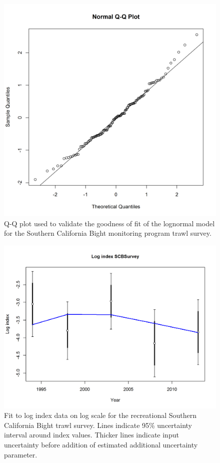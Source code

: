 \documentclass[12pt,]{article}
\begin{document}
\FloatBarrier

\begin{figure}[htbp]
\centering
\includegraphics{Figures/Fleet11_SCBsurvey_QQ.png}
\caption{Q-Q plot used to validate the goodness of fit of the lognormal
model for the Southern California Bight monitoring program trawl survey.
\label{fig:Fleet11_SCBsurvey_QQ}}
\end{figure}

\begin{figure}[htbp]
\centering
\includegraphics{r4ss/plots_mod1/index5_logcpuefit_SCBSurvey.png}
\caption{Fit to log index data on log scale for the recreational
Southern California Bight trawl survey. Lines indicate 95\% uncertainty
interval around index values. Thicker lines indicate input uncertainty
before addition of estimated additional uncertainty parameter.
\label{fig:index5_logcpuefit_SCBSurvey}}
\end{figure}
\end{document}
